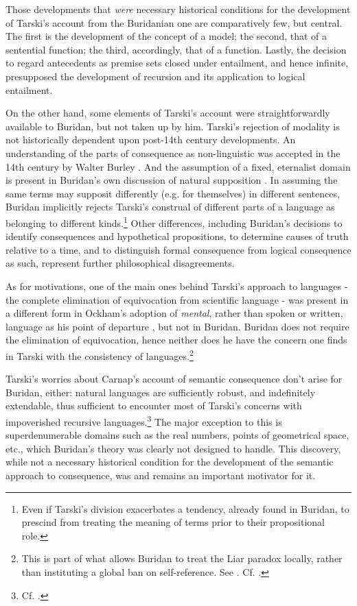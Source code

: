\documentclass[]{article}
\begin{document}
Those developments that \textit{were} necessary historical conditions for the development of Tarski's account from the Buridanian one are comparatively few, but central. The first is the development of the concept of a model; the second, that of a sentential function; the third, accordingly, that of a function. Lastly, the decision to regard antecedents as premise sets closed under entailment, and hence infinite, presupposed the development of recursion and its application to logical entailment.

On the other hand, some elements of Tarski's account were straightforwardly available to Buridan, but not taken up by him. Tarski's rejection of modality is not historically dependent upon post-14th century developments. An understanding of the parts of consequence as non-linguistic was accepted in the 14th century by Walter Burley \cite{Bulthuis2016}. And the assumption of a fixed, eternalist domain is present in Buridan's own discussion of natural supposition \cite[SD 4.3.4]{BuridanKlimaSD}. In assuming the same terms may supposit differently (e.g. for themselves) in different sentences, Buridan implicitly rejects Tarski's construal of different parts of a language as belonging to different kinds.\footnote{Even if Tarski's division exacerbates a tendency, already found in Buridan, to prescind from treating the meaning of terms prior to their propositional role.} Other differences, including Buridan's decisions to identify consequences and hypothetical propositions, to determine causes of truth relative to a time, and to distinguish formal consequence from logical consequence as such, represent further philosophical disagreements.

As for motivations, one of the main ones behind Tarski's approach to languages - the complete elimination of equivocation from scientific language - was present in a different form in Ockham's adoption of \textit{mental}, rather than spoken or written, language as his point of departure \cite{Trentman1970} \cite{Spade1980} \cite{Chalmers1999}, but not in Buridan. Buridan does not require the elimination of equivocation, hence neither does he have the concern one finds in Tarski with the consistency of languages.\footnote{This is part of what allows Buridan to treat the Liar paradox locally, rather than instituting a global ban on self-reference. See \cite[SD 9.2.6]{BuridanKlimaSD}. Cf. \cite{Klima2004} \cite{Klima2008} \cite{DutilhNovaes2011b} \cite{Benetreau-Dupin2015}.}

Tarski's worries about Carnap's account of semantic consequence don't arise for Buridan, either: natural languages are sufficiently robust, and indefinitely extendable, thus sufficient to encounter most of Tarski's concerns with impoverished recursive languages.\footnote{Cf. \cite{BarcanMarcus1978}.} The major exception to this is superdenumerable domains such as the real numbers, points of geometrical space, etc., which Buridan's theory was clearly not designed to handle. This discovery, while not a necessary historical condition for the development of the semantic approach to consequence, was and remains an important motivator for it.
\end{document}
